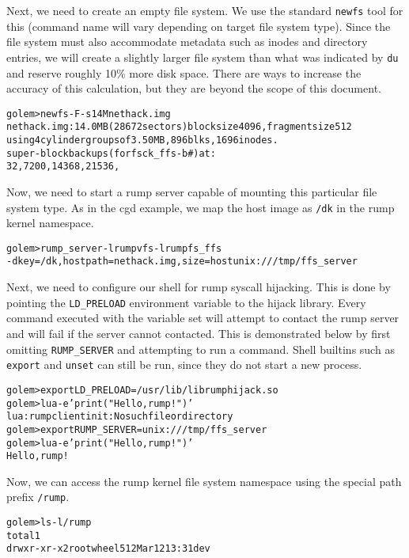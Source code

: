 Next, we need to create an empty file system.  We use the standard
\verb+newfs+ tool for this (command
name will vary depending on target file system type).  Since the
file system must also accommodate metadata such as inodes and
directory entries, we will create a slightly larger file system
than what was indicated by \verb+du+ and reserve roughly 10\%
more disk space.  There are ways to increase the accuracy of this
calculation, but they are beyond the scope of this document.

{\footnotesize
\begin{alltt}
golem> newfs -F -s 14M nethack.img
nethack.img: 14.0MB (28672 sectors) block size 4096, fragment size 512
        using 4 cylinder groups of 3.50MB, 896 blks, 1696 inodes.
super-block backups (for fsck_ffs -b #) at:
32, 7200, 14368, 21536,
\end{alltt}}

Now, we need to start a rump server capable of mounting this particular
file system type.  As in the cgd example, we map the
host image as \verb+/dk+ in the rump kernel namespace.

{\footnotesize
\begin{alltt}
golem> rump_server -lrumpvfs -lrumpfs_ffs
    -d key=/dk,hostpath=nethack.img,size=host unix:///tmp/ffs_server
\end{alltt}}

Next, we need to configure our shell for rump syscall hijacking.
This is done by pointing the \verb+LD_PRELOAD+ environment
variable to the hijack library.  Every command executed with the
variable set will attempt to contact the rump server and will fail
if the server cannot contacted.  This is demonstrated below by first
omitting \verb+RUMP_SERVER+ and attempting to run a command.
Shell builtins such as \verb+export+ and \verb+unset+ can
still be run, since they do not start a new process.

{\footnotesize
\begin{alltt}
golem> export LD_PRELOAD=/usr/lib/librumphijack.so
golem> lua -e 'print("Hello, rump!")'
lua: rumpclient init: No such file or directory
golem> export RUMP_SERVER=unix:///tmp/ffs_server
golem> lua -e 'print("Hello, rump!")'
Hello, rump!
\end{alltt}}

Now, we can access the rump kernel file system namespace using the
special path prefix \verb+/rump+.

{\footnotesize
\begin{alltt}
golem> ls -l /rump
total 1
drwxr-xr-x  2 root  wheel  512 Mar 12 13:31 dev
\end{alltt}}

